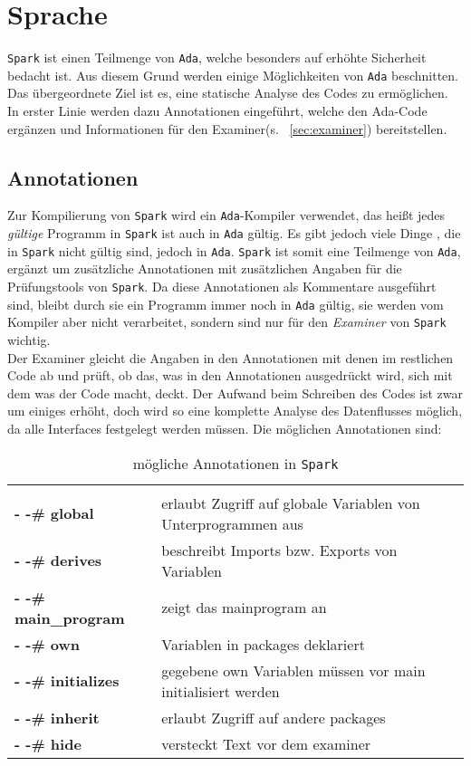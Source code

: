 \section{Sprache}
\label{sec:Sprache}
\texttt{Spark} ist einen Teilmenge von \texttt{Ada}, welche besonders auf erhöhte Sicherheit bedacht ist. Aus diesem Grund werden einige Möglichkeiten von \texttt{Ada} beschnitten. Das übergeordnete Ziel ist es, eine statische Analyse des Codes zu ermöglichen. In erster Linie werden dazu Annotationen eingeführt, welche den Ada-Code ergänzen und Informationen für den Examiner(s. ~\ref{sec:examiner}) bereitstellen.

\subsection{Annotationen}
\label{subsec:Annotationen}
Zur Kompilierung von \texttt{Spark} wird ein \texttt{Ada}-Kompiler verwendet, das heißt jedes \textit{gültige} Programm in \texttt{Spark} ist auch in \texttt{Ada} gültig. Es gibt jedoch viele Dinge , die in \texttt{Spark} nicht gültig sind, jedoch in \texttt{Ada}. \texttt{Spark} ist somit eine Teilmenge von \texttt{Ada}, ergänzt um zusätzliche Annotationen mit zusätzlichen Angaben für die Prüfungstools von \texttt{Spark}. Da diese Annotationen als Kommentare ausgeführt sind, bleibt durch sie ein Programm immer noch in \texttt{Ada} gültig, sie werden vom Kompiler aber nicht verarbeitet, sondern sind nur für den \textit{Examiner} von \texttt{Spark} wichtig.\\
Der Examiner gleicht die Angaben in den Annotationen mit denen im restlichen Code ab und prüft, ob das, was in den Annotationen ausgedrückt wird, sich mit dem was der Code macht, deckt. Der Aufwand beim Schreiben des Codes ist zwar um einiges erhöht, doch wird so eine komplette Analyse des Datenflusses möglich, da alle Interfaces festgelegt werden müssen.
Die möglichen Annotationen sind:
\begin{table}[h!]
\centering
\caption{mögliche Annotationen in \texttt{Spark}}
\label{tab:annotations}
\begin{tabular}{ll}
&\\
\textbf{- -\# global} & erlaubt Zugriff auf globale Variablen von Unterprogrammen aus\\
\textbf{- -\# derives} & beschreibt Imports bzw. Exports von Variablen\\
\textbf{- -\# main\_program} & zeigt das mainprogram an\\
\textbf{- -\# own} & Variablen in packages deklariert\\
\textbf{- -\# initializes} & gegebene own Variablen müssen vor main initialisiert werden\\
\textbf{- -\# inherit} & erlaubt Zugriff auf andere packages\\
\textbf{- -\# hide} & versteckt Text vor dem examiner\\
\end{tabular}
\end{table}



